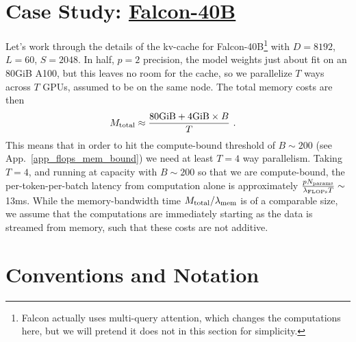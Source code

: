 \documentclass[11pt]{article}
\begin{document}
\section{Case Study: \href{https://huggingface.co/tiiuae/falcon-40b-instruct?_sm_vck=j230jZ2ssDkkPfJTfRt6tjQNTQZJ65N7VDWmj5Ff6f3jZ3mhh2Pq}{Falcon-40B}}

Let's work through the details of the kv-cache for Falcon-40B\footnote{Falcon actually uses
multi-query attention, which changes the computations here, but we will pretend it does not in this
section for simplicity.} with $ D=8192 $, $ L=60 $, $ S=2048 $.  In half, $ p=2 $ precision, the model weights just about fit on an
80GiB A100, but this leaves no room for the cache, so we parallelize $ T $ ways across $ T $ GPUs,
assumed to be on the same node. The total memory costs are then
\begin{align}
    M _{ {\rm  total} } &\approx  \frac{ {\rm 80GiB} + {\rm 4GiB}\times B }{ T } \ .
\end{align}
This means that in order to hit the compute-bound threshold of $ B \sim 200 $ (see
App.~\ref{app_flops_mem_bound}) we need at least $ T=4 $ way parallelism.  Taking $ T=4 $, and running
at capacity with $ B \sim 200$ so that we are compute-bound, the per-token-per-batch latency from computation alone
is approximately $ \frac{ pN _{ {\rm params} } }{ \lambda _{ {\rm FLOPs} } T} \sim $13ms. While the
memory-bandwidth time $ M _{ {\rm total} } / \lambda _{ {\rm mem} } $ is of a comparable size, we assume
that the computations are immediately starting as the data is streamed from memory, such that these
costs are not additive.












\appendix



\section{Conventions and Notation\label{app_conventions}}
\end{document}
